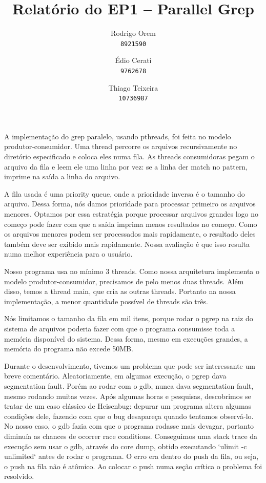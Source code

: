 \documentclass[11pt]{article}
\begin{document}
\author{
    Rodrigo Orem\\
    \texttt{8921590}
    \and
    Édio Cerati\\
    \texttt{9762678}
    \and
    Thiago Teixeira\\
    \texttt{10736987}
}

\title{\vspace{-2em}Relatório do EP1 -- Parallel Grep}
\maketitle

A implementação do grep paralelo, usando pthreads, foi feita no modelo
produtor-consumidor. Uma thread percorre os arquivos recursivamente no
diretório especificado e coloca eles numa fila. As threads consumidoras
pegam o arquivo da fila e leem ele uma linha por vez: se a linha der
match no pattern, imprime na saída a linha do arquivo.

A fila usada é uma priority queue, onde a prioridade inversa é o tamanho
do arquivo. Dessa forma, nós damos prioridade para processar primeiro os
arquivos menores. Optamos por essa estratégia porque processar arquivos
grandes logo no começo pode fazer com que a saída imprima menos
resultados no começo. Como os arquivos menores podem ser processados
mais rapidamente, o resultado deles também deve ser exibido mais
rapidamente. Nossa avaliação é que isso resulta numa melhor experiência
para o usuário.

Nosso programa usa no mínimo 3 threads. Como nossa arquitetura
implementa o modelo produtor-consumidor, precisamos de pelo menos duas
threads. Além disso, temos a thread main, que cria as outras threads.
Portanto na nossa implementação, a menor quantidade possível de threads
são três.

Nós limitamos o tamanho da fila em mil itens, porque rodar o pgrep na
raiz do sistema de arquivos poderia fazer com que o programa consumisse
toda a memória disponível do sistema. Dessa forma, mesmo em execuções
grandes, a memória do programa não excede 50MB.

Durante o desenvolvimento, tivemos um problema que pode ser interessante
um breve comentário. Aleatoriamente, em algumas execução, o pgrep dava
segmentation fault. Porém ao rodar com o gdb, nunca dava segmentation
fault, mesmo rodando muitas vezes. Após algumas horas e pesquisas,
descobrimos se tratar de um caso clássico de Heisenbug: depurar um
programa altera algumas condições dele, fazendo com que o bug desapareça
quando tentamos observá-lo. No nosso caso, o gdb fazia com que o
programa rodasse mais devagar, portanto diminuía as chances de ocorrer
race conditions. Conseguimos uma stack trace da execução sem usar o gdb,
através do core dump, obtido executando `ulimit -c unlimited` antes de
rodar o programa. O erro era dentro do push da fila, ou seja, o push na
fila não é atômico. Ao colocar o push numa seção crítica o problema foi
resolvido.
\end{document}
